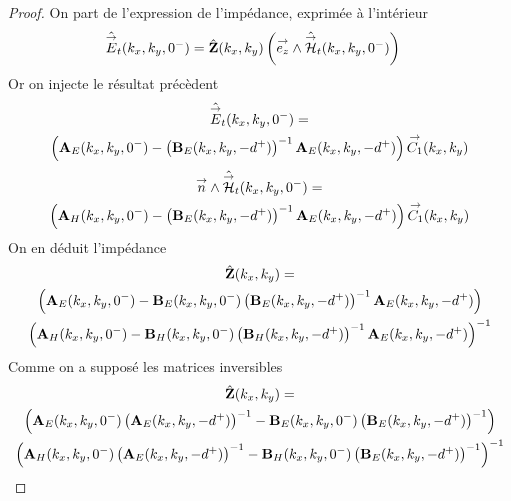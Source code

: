 \begin{proof}
            On part de l'expression de l'impédance, exprimée à l'intérieur
            \begin{align}
                \hat {{\overset{\rightarrow}{E}}}_t(k_x,k_y,0^-) &= \hat {\mathbf{Z}}(k_x,k_y) \left({\overset{\rightarrow}{e_z}} \wedge \hat {{\overset{\rightarrow}{\mathcal{H}}}}_t(k_x,k_y,0^-)\right)
            \end{align}
            Or on injecte le résultat précèdent
            \begin{multline}
                \hat {{\overset{\rightarrow}{E}}}_t(k_x,k_y,0^-) = \\
                \left(\mathbf{A}_E(k_x,k_y,0^-)-\left(\mathbf{B}_E(k_x,k_y,-d^+)\right)^{-1}\mathbf{A}_E(k_x,k_y,-d^+)\right){\overset{\rightarrow}{C_1}}(k_x,k_y)
            \end{multline}
            \begin{multline}
                {\overset{\rightarrow}{n}} \wedge \hat {{\overset{\rightarrow}{\mathcal{H}}}}_t(k_x,k_y,0^-) = \\
                 \left(\mathbf{A}_H(k_x,k_y,0^-)-\left(\mathbf{B}_E(k_x,k_y,-d^+)\right)^{-1}\mathbf{A}_E(k_x,k_y,-d^+)\right){\overset{\rightarrow}{C_1}}(k_x,k_y)
            \end{multline}
            On en déduit l'impédance
            \begin{multline}
                \hat {\mathbf{Z}}(k_x,k_y) = \\ \left(\mathbf{A}_E(k_x,k_y,0^-)-\mathbf{B}_E(k_x,k_y,0^-)\left(\mathbf{B}_E(k_x,k_y,-d^+)\right)^{-1}\mathbf{A}_E(k_x,k_y,-d^+)\right)\\
                \left(\mathbf{A}_H(k_x,k_y,0^-)-\mathbf{B}_H(k_x,k_y,0^-)\left(\mathbf{B}_H(k_x,k_y,-d^+)\right)^{-1}\mathbf{A}_E(k_x,k_y,-d^+)\right)^{-1}
            \end{multline}
            Comme on a supposé les matrices inversibles
            \begin{multline}
                \hat {\mathbf{Z}}(k_x,k_y) = \\ \left(\mathbf{A}_E(k_x,k_y,0^-)\left(\mathbf{A}_E(k_x,k_y,-d^+)\right)^{-1}-\mathbf{B}_E(k_x,k_y,0^-)\left(\mathbf{B}_E(k_x,k_y,-d^+)\right)^{-1}\right) \\
                \left(\mathbf{A}_H(k_x,k_y,0^-)\left(\mathbf{A}_E(k_x,k_y,-d^+)\right)^{-1}-\mathbf{B}_H(k_x,k_y,0^-)\left(\mathbf{B}_E(k_x,k_y,-d^+)\right)^{-1}\right)^{-1}
            \end{multline}


\end{proof}
